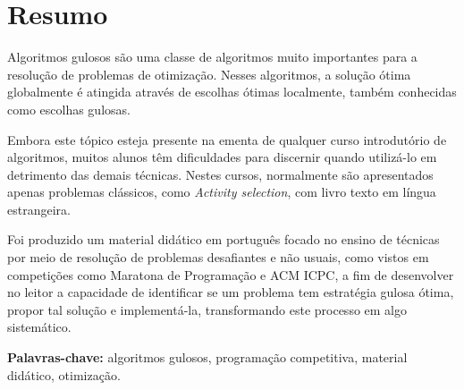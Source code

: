 \chapter{Resumo}
\label{resumo}

Algoritmos gulosos são uma classe de algoritmos muito importantes para a resolução de problemas de otimização. Nesses algoritmos, a solução ótima globalmente é atingida através de escolhas ótimas localmente, também conhecidas como escolhas gulosas.

Embora este tópico esteja presente na ementa de qualquer curso introdutório de algoritmos, muitos alunos têm dificuldades para discernir quando utilizá-lo em detrimento das demais técnicas. Nestes cursos, normalmente são apresentados apenas problemas clássicos, como \emph{Activity selection}, com livro texto em língua estrangeira.

Foi produzido um material didático em português focado no ensino de técnicas por meio de resolução de problemas desafiantes e não usuais, como vistos em competições como Maratona de Programação e ACM ICPC, a fim de desenvolver no leitor a capacidade de identificar se um problema tem estratégia gulosa ótima, propor tal solução e implementá-la, transformando este processo em algo sistemático.


\textbf{Palavras-chave:} algoritmos gulosos, programação competitiva, material didático, otimização.
